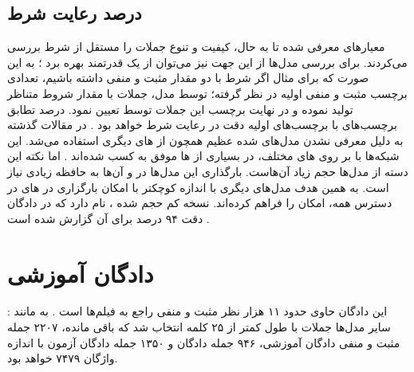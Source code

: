 \subsection{درصد رعایت شرط}
معیارهای معرفی شده تا به حال، کیفیت و تنوع جملات را مستقل از شرط بررسی می‌کردند. برای بررسی مدل‌ها از این جهت نیز می‌توان از یک \classifier{} قدرتمند بهره برد 
\cite{toward, sentigan}؛
به این صورت که برای مثال اگر شرط با دو مقدار مثبت و منفی داشته باشیم، تعدادی برچسب مثبت و منفی اولیه در نظر گرفته؛ توسط مدل، جملات با مقدار شروط متناظر تولید نموده و در نهایت برچسب این جملات توسط \classifier{} تعیین نمود. درصد تطابق برچسب‌های \classifier{} با برچسب‌های اولیه دقت در رعایت شرط خواهد بود 
\cite{toward, sentigan}.
در مقالات گذشته به دلیل معرفی نشدن مدل‌های \pretrain{} شده عظیم همچون  از \classifier{}های دیگری استفاده می‌شد. این شبکه‌ها با 
بر روی \task{}‌های مختلف، در بسیاری از \task{}ها موفق به کسب \stateoftheart{} شده‌اند \cite{bert}. اما نکته این دسته از مدل‌ها حجم زیاد آن‌هاست. بارگذاری  این مدل‌ها در \gpu{} و \finetuning{} آن‌ها به حافظه زیادی نیاز است. به همین هدف مدل‌های دیگری با اندازه کوچکتر با امکان بارگزاری در \gpu{}‌های در دسترس همه، امکان \finetuning{} را فراهم کرده‌اند. نسخه کم حجم شده ، 
نام دارد که در دادگان  دقت ۹۴ درصد برای آن گزارش شده است \cite{distilbert}.
\iffalse
می‌توان به عنوان جایگزین از معیارهایی همچون \revperplexity{} استفاده نمود. این روش به این صورت است که یک مدل زبانی میانی با استفاده از نمونه‌های مدل آموزش داده شده و \likelihood{} نمونه‌های آموزشی در مدل آموزش داده شده اندازه‌گیری می‌شود. این معیار نیز حساس به کیفیت و تنوع است. اگر مدل میانی آموزش داده شده، چه به دلیل عدم تنوع  و یا عدم کیفیت نمونه‌های مدل مورد ارزیابی احتمال کمی به نمونه‌های آموزشی نسبت دهد، معیار حساس بوده و مدل را جریمه خواهد کرد. نکته قابل توجه این است که به دلیل اینکه معیار آموزش مدل میانی، بر اساس بیشینه کردن \likelihood{} است، این امکان وجود دارد تا مدل مورد آموزش رفتار \meanseeking{} از خود بروز داده و به نقاطی که نمونه آموزشی از آن‌ها وجود ندارد، احتمال بالایی نسبت دهد. اما این اتفاق زمانی رخ می‌دهد که ظرفیت مدل کمتر از پیچیدگی نمونه‌های آموزشی باشد؛ این در حالیست که این نمونه‌های آموزشی توسط مدل مشابهی با ظرفیت مشابه تولید شده اند و احتمالا چنین نگرانی‌ای وجود نخواهد داشت.
\fi
\section{دادگان آموزشی}
:
این دادگان حاوی حدود ۱۱ هزار نظر مثبت و منفی راجع به فیلم‌ها است \cite{sst}. به مانند سایر مدل‌ها جملات با طول کمتر از ۲۵ کلمه انتخاب شد که باقی مانده، ۲۲۰۷ جمله مثبت و منفی دادگان آموزشی، ۹۴۶ جمله دادگان \validation{} و ۱۳۵۰ جمله دادگان آزمون با اندازه واژگان ۷۴۷۹ خواهد بود.
